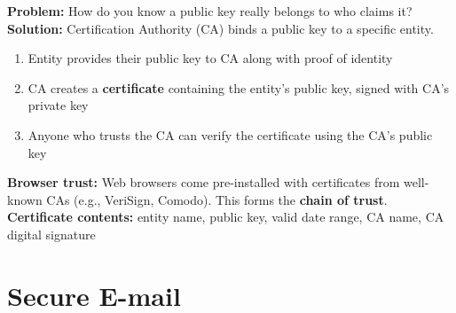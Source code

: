\begin{tcolorbox}[keybox, title=Public Key Infrastructure and CAs]
\textbf{Problem:} How do you know a public key really belongs to who claims it?\\[4pt]
\textbf{Solution:} Certification Authority (CA) binds a public key to a specific entity.
\begin{enumerate}[noitemsep]
  \item Entity provides their public key to CA along with proof of identity
  \item CA creates a \textbf{certificate} containing the entity's public key, signed with CA's private key
  \item Anyone who trusts the CA can verify the certificate using the CA's public key
\end{enumerate}
\textbf{Browser trust:} Web browsers come pre-installed with certificates from well-known CAs (e.g., VeriSign, Comodo). This forms the \textbf{chain of trust}.\\[4pt]
\textbf{Certificate contents:} entity name, public key, valid date range, CA name, CA digital signature
\end{tcolorbox}

\section{Secure E-mail}

